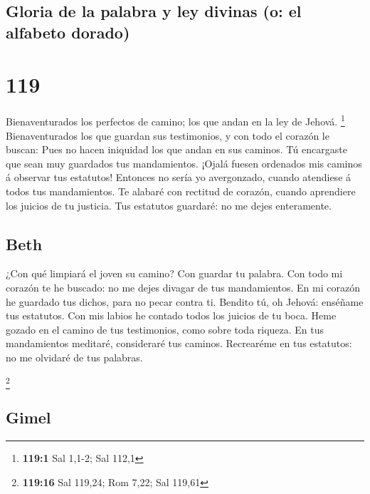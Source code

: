 \hypertarget{gloria-de-la-palabra-y-ley-divinas-o-el-alfabeto-dorado}{%
\subsection{Gloria de la palabra y ley divinas (o: el alfabeto
dorado)}\label{gloria-de-la-palabra-y-ley-divinas-o-el-alfabeto-dorado}}

\hypertarget{section-118}{%
\section{119}\label{section-118}}

 Bienaventurados los perfectos de camino; los que andan en
la ley de Jehová. \footnote{\textbf{119:1} Sal 1,1-2; Sal 112,1}
 Bienaventurados los que guardan sus testimonios, y con todo
el corazón le buscan:  Pues no hacen iniquidad los que andan
en sus caminos.  Tú encargaste que sean muy guardados tus
mandamientos.  ¡Ojalá fuesen ordenados mis caminos á
observar tus estatutos!  Entonces no sería yo avergonzado,
cuando atendiese á todos tus mandamientos.  Te alabaré con
rectitud de corazón, cuando aprendiere los juicios de tu justicia.
 Tus estatutos guardaré: no me dejes enteramente.

\hypertarget{beth}{%
\subsection{Beth}\label{beth}}

 ¿Con qué limpiará el joven su camino? Con guardar tu
palabra.  Con todo mi corazón te he buscado: no me dejes
divagar de tus mandamientos.  En mi corazón he guardado tus
dichos, para no pecar contra ti.  Bendito tú, oh Jehová:
enséñame tus estatutos.  Con mis labios he contado todos
los juicios de tu boca.  Heme gozado en el camino de tus
testimonios, como sobre toda riqueza.  En tus mandamientos
meditaré, consideraré tus caminos.  Recrearéme en tus
estatutos: no me olvidaré de tus palabras.

\footnote{\textbf{119:16} Sal 119,24; Rom 7,22; Sal 119,61}

\hypertarget{gimel}{%
\subsection{Gimel}\label{gimel}}

